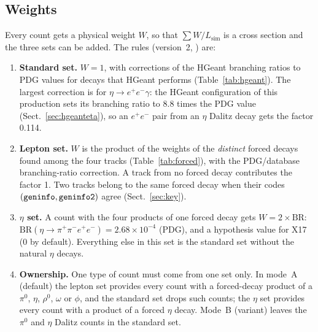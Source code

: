 \documentclass[11pt,a4paper]{article}
\newcommand{\piz}{\ensuremath{\pi^{0}}\xspace}
\newcommand{\ee}{\ensuremath{e^{+}e^{-}}\xspace}
\newcommand{\ppee}{\ensuremath{\pi^{+}\pi^{-}e^{+}e^{-}}\xspace}
\newcommand{\Lsim}{\ensuremath{L_{\mathrm{sim}}}\xspace}
\newcommand{\code}[1]{\texttt{\detokenize{#1}}}
\begin{document}
\subsection{Weights}
\label{sec:weights}
Every count gets a physical weight $W$, so that $\sum W/\Lsim$ is a cross section and the
three sets can be added. The rules (version~2, \code{src/sim_truth.h}) are:
\begin{enumerate}
\item \textbf{Standard set.} $W=1$, with corrections of the HGeant branching ratios to PDG
      values for decays that HGeant performs (Table~\ref{tab:hgeant}). The largest correction
      is for $\eta\to\ee\gamma$: the HGeant configuration of this production sets its branching
      ratio to 8.8 times the PDG value (Sect.~\ref{sec:hgeanteta}), so an \ee pair from an $\eta$
      Dalitz decay gets the factor 0.114.
\item \textbf{Lepton set.} $W$ is the product of the weights of the \emph{distinct} forced
      decays found among the four tracks (Table~\ref{tab:forced}), with the PDG/database
      branching-ratio correction. A track from no forced decay contributes the factor 1.
      Two tracks belong to the same forced decay when their codes $(\code{geninfo},
      \code{geninfo2})$ agree (Sect.~\ref{sec:key}).
\item \textbf{$\eta$ set.} A count with the four products of one forced decay gets
      $W = 2\times\mathrm{BR}$: $\mathrm{BR}(\eta\to\ppee) = 2.68\times10^{-4}$ (PDG), and a
      hypothesis value for X17 (0 by default). Everything else in this set is the standard
      set without the natural $\eta$ decays.
\item \textbf{Ownership.} One type of count must come from one set only. In mode~A (default) the
      lepton set provides every count with a forced-decay product of a \piz, $\eta$, $\rho^0$,
      $\omega$ or $\phi$, and the standard set drops such counts; the $\eta$ set provides every
      count with a product of a forced $\eta$ decay. Mode~B (variant) leaves the \piz and $\eta$
      Dalitz counts in the standard set.
\end{enumerate}
\end{document}
